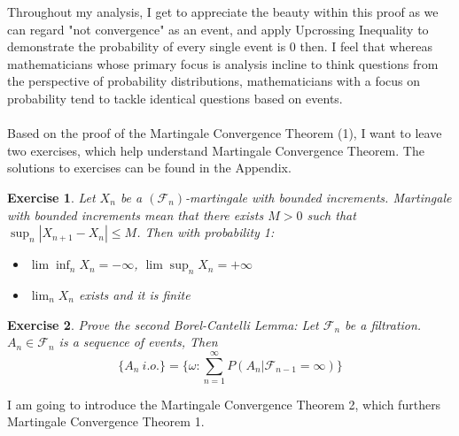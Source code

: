 \documentclass[10pt]{article}
\newtheorem{exercise}{Exercise}
\begin{document}
Throughout my analysis, I get to appreciate the beauty within this proof as we can regard "not convergence" as an event, and apply Upcrossing Inequality to demonstrate the probability of every single event is 0 then. I feel that whereas mathematicians whose primary focus is analysis incline to think questions from the perspective of probability distributions, mathematicians with a focus on probability tend to tackle identical questions based on events.\\\\
Based on the proof of the Martingale Convergence Theorem (1), I want to leave two exercises, which help understand Martingale Convergence Theorem. The solutions to exercises can be found in the Appendix.
\begin{exercise}
Let $X_n$ be a $(\mathcal{F}_n)$-martingale with bounded increments. Martingale with bounded increments mean that there exists $M>0$ such that $\sup_n |X_{n+1}-X_n|\le M$. Then with probability 1:\begin{itemize}
    \item $\lim \inf_n X_n=-\infty$, $\lim \sup_n X_n=+\infty$
    \item $\lim_n X_n$ exists and it is finite
\end{itemize}
\end{exercise}
\begin{exercise}
Prove the second Borel-Cantelli Lemma: Let $\mathcal{F}_n$ be a filtration. $A_n \in \mathcal{F}_n$ is a sequence of events, Then $$\{A_n \ i.o.\}=\{\omega: \sum_{n=1}^{\infty}P(A_n|\mathcal{F}_{n-1}=\infty)\}$$
\end{exercise}
I am going to introduce the Martingale Convergence Theorem 2, which furthers Martingale Convergence Theorem 1.
\end{document}
